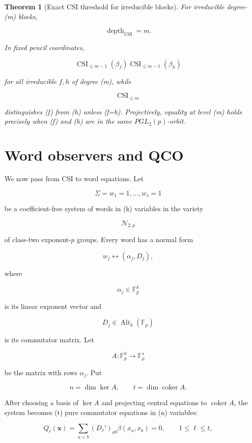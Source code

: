 \documentclass[11pt]{article}
\newtheorem{theorem}{Theorem}[section]
\begin{document}
\begin{theorem}[Exact CSI threshold for irreducible blocks]
For irreducible degree-(m) blocks,

\[
\operatorname{depth}_{\mathrm{CSI}}=m.
\]

In fixed pencil coordinates,

\[
\operatorname{CSI}_{\le m-1}(\beta_f)
\operatorname{CSI}_{\le m-1}(\beta_h)
\]

for all irreducible $f,h$ of degree (m), while

\[
\operatorname{CSI}_{\le m}
\]

distinguishes (f) from (h) unless (f=h). Projectively, equality at level (m) holds precisely when (f) and (h) are in the same $PGL_2(p)$-orbit.

\end{theorem}

\section{Word observers and QCO}

We now pass from CSI to word equations. Let

\[
\Sigma={w_1=1,\ldots,w_s=1}
\]

be a coefficient-free system of words in (k) variables in the variety

\[
\mathcal N_{2,p}
\]

of class-two exponent-$p$ groups. Every word has a normal form

\[
w_j
\longleftrightarrow
(\alpha_j,D_j),
\]

where

\[
\alpha_j\in\mathbb F_p^k
\]

is its linear exponent vector and

\[
D_j\in\operatorname{Alt}_k(\mathbb F_p)
\]

is its commutator matrix. Let

\[
A:\mathbb F_p^k\to\mathbb F_p^s
\]

be the matrix with rows $\alpha_j$. Put

\[
n=\dim\ker A,
\qquad
t=\dim\operatorname{coker}A.
\]

After choosing a basis of $\ker A$ and projecting central equations to $\operatorname{coker}A$, the system becomes (t) pure commutator equations in (n) variables:

\[
Q_\ell(\mathbf x)
=\sum_{a<b}(D_\ell')_{ab}\beta(x_a,x_b)
=0,
\qquad
1\le \ell\le t,
\tag{9.1}
\]
\end{document}
